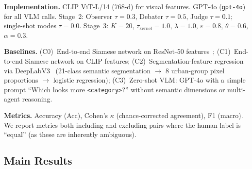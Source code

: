 \documentclass[runningheads]{llncs}
\begin{document}
\smallskip\noindent\textbf{Implementation.}
CLIP ViT-L/14 (768-d) for visual features.
GPT-4o (\texttt{gpt-4o}) for all VLM calls.
Stage~2: Observer $\tau{=}0.3$, Debater $\tau{=}0.5$, Judge $\tau{=}0.1$; single-shot modes $\tau{=}0.0$.
Stage~3: $K{=}20$, $\tau_{\mathrm{kernel}}{=}1.0$, $\lambda{=}1.0$, $\varepsilon{=}0.8$, $\theta{=}0.6$, $\alpha{=}0.3$.

\smallskip\noindent\textbf{Baselines.}
(C0)~End-to-end Siamese network on ResNet-50 features~\cite{koch2015siamese};
(C1)~End-to-end Siamese network on CLIP features;
(C2)~Segmentation-feature regression via DeepLabV3~\cite{chen2018deeplabv3plus} (21-class semantic segmentation $\to$ 8 urban-group pixel proportions $\to$ logistic regression);
(C3)~Zero-shot VLM: GPT-4o with a simple prompt ``Which looks more \texttt{<category>}?'' without semantic dimensions or multi-agent reasoning.

\smallskip\noindent\textbf{Metrics.}
Accuracy (Acc), Cohen's $\kappa$ (chance-corrected agreement), F1 (macro).
We report metrics both including and excluding pairs where the human label is ``equal'' (as these are inherently ambiguous).

\subsection{Main Results}
\end{document}
